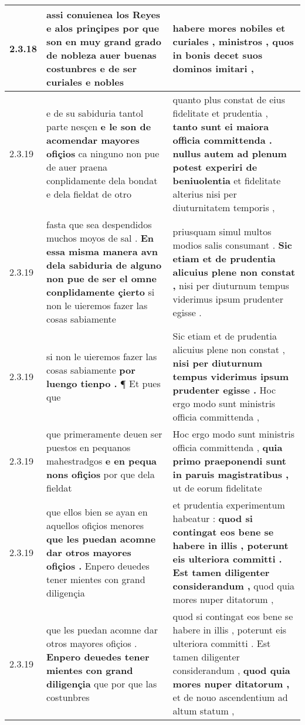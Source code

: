 \begin{tabular}{|p{1cm}|p{6.5cm}|p{6.5cm}|}
2.3.18 & assi conuienea los Reyes e alos prinçipes \textbf{ por que son en muy grand grado de nobleza auer buenas costunbres } e de ser curiales e nobles & habere mores nobiles et curiales , \textbf{ ministros , } quos in bonis decet suos dominos imitari , \\\hline
2.3.19 & e de su sabiduria tantol parte nesçen \textbf{ e le son de acomendar mayores ofiçios } ca ninguno non pue de auer praena conplidamente dela bondat e dela fieldat de otro & quanto plus constat de eius fidelitate et prudentia , \textbf{ tanto sunt ei maiora officia committenda . nullus autem ad plenum potest experiri de beniuolentia } et fidelitate alterius nisi per diuturnitatem temporis , \\\hline
2.3.19 & fasta que sea despendidos muchos moyos de sal . \textbf{ En essa misma manera avn dela sabiduria de alguno non pue de ser el omne conplidamente çierto } si non le uieremos fazer las cosas sabiamente & priusquam simul multos modios salis consumant . \textbf{ Sic etiam et de prudentia alicuius plene non constat , } nisi per diuturnum tempus viderimus ipsum prudenter egisse . \\\hline
2.3.19 & si non le uieremos fazer las cosas sabiamente \textbf{ por luengo tienpo . } ¶ Et pues que & Sic etiam et de prudentia alicuius plene non constat , \textbf{ nisi per diuturnum tempus viderimus ipsum prudenter egisse . } Hoc ergo modo sunt ministris officia committenda , \\\hline
2.3.19 & que primeramente deuen ser puestos en pequanos mahestradgos \textbf{ e en pequa nons ofiçios } por que dela fieldat & Hoc ergo modo sunt ministris officia committenda , \textbf{ quia primo praeponendi sunt in paruis magistratibus , } ut de eorum fidelitate \\\hline
2.3.19 & que ellos bien se ayan en aquellos ofiçios menores \textbf{ que les puedan acomne dar otros mayores ofiçios . } Enpero deuedes tener mientes con grand diligençia & et prudentia experimentum habeatur : \textbf{ quod si contingat eos bene se habere in illis , poterunt eis ulteriora committi . Est tamen diligenter considerandum , } quod quia mores nuper ditatorum , \\\hline
2.3.19 & que les puedan acomne dar otros mayores ofiçios . \textbf{ Enpero deuedes tener mientes con grand diligençia } que por que las costunbres & quod si contingat eos bene se habere in illis , poterunt eis ulteriora committi . Est tamen diligenter considerandum , \textbf{ quod quia mores nuper ditatorum , } et de nouo ascendentium ad altum statum , \\\hline

\end{tabular}
